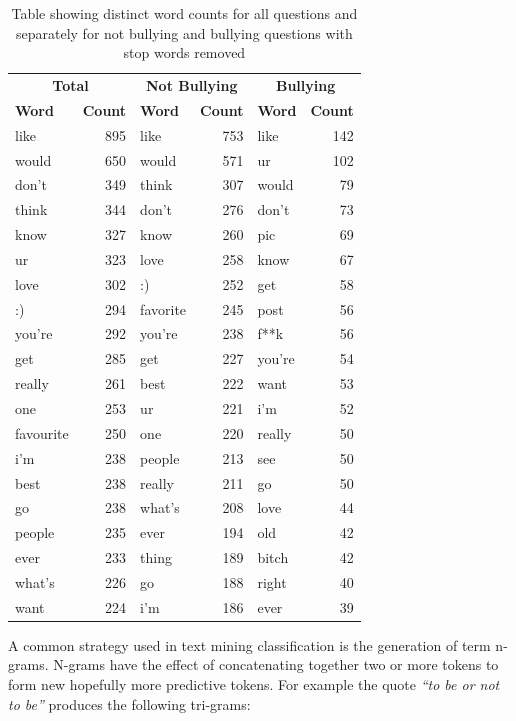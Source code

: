 \begin{table}[h]
\centering
\caption[Distinct word counts, no stop words]{Table showing distinct word counts for all questions and separately for not bullying and bullying questions with stop words removed}
\label{tab:chapter4:word_count_nostop}
\begin{tabular}{lrlrlr}
	\toprule
	\multicolumn{2}{c}{\textbf{Total}} & \multicolumn{2}{c}{\textbf{Not Bullying}} & \multicolumn{2}{c}{\textbf{Bullying}}\\
	\cmidrule(r){1-2}
	\cmidrule(r){3-4}
	\cmidrule(r){5-6}
    \textbf{Word} & \textbf{Count} & \textbf{Word} & \textbf{Count} & \textbf{Word} & \textbf{Count}           \\
    \midrule
	like	& 895	&	like	&	753	&	like	&	142	\\
	would	& 650	&	would	&	571	&	ur		&	102	\\
	don't	& 349	&	think	&	307	&	would	&	79	\\
	think	& 344	&	don't	&	276	&	don't	&	73	\\
	know	& 327	&	know	&	260	&	pic		&	69	\\
	ur		& 323	&	love	&	258	&	know	&	67	\\
	love	& 302	&	:)		&	252	&	get		&	58	\\
	:)		& 294	&	favorite&	245	&	post	&	56	\\
	you're	& 292	&	you're	&	238	&	f**k	&	56	\\
	get		& 285	&	get		&	227	&	you're	&	54	\\
	really	& 261	&	best	&	222	&	want	&	53	\\
	one		& 253	&	ur		&	221	&	i'm		&	52	\\
	favourite& 250	&	one		&	220	&	really	&	50	\\
	i'm		& 238	&	people	&	213	&	see		&	50	\\
	best	& 238	&	really	&	211	&	go		&	50	\\
	go		& 238	&	what's	&	208	&	love	&	44	\\
	people	& 235	&	ever	&	194	&	old		&	42	\\
	ever	& 233	&	thing	&	189	&	bitch	&	42	\\
	what's	& 226	&	go		&	188	&	right	&	40	\\
	want	& 224	&	i'm		&	186	&	ever	&	39	\\
    \bottomrule
    \end{tabular}
\end{table}

A common strategy used in text mining classification is the generation of term n-grams. N-grams have the effect of concatenating together two or more tokens to form new hopefully more predictive tokens. For example the quote \textit{``to be or not to be''} produces the following tri-grams:

